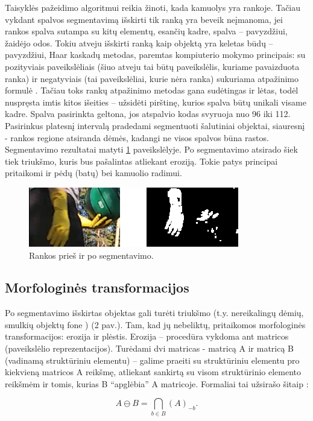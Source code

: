 \documentclass{VUMIFPSkursinis}
\begin{document}
Taisyklės pažeidimo algoritmui reikia žinoti, kada kamuolys yra rankoje. Tačiau vykdant spalvos segmentavimą išskirti tik ranką yra beveik neįmanoma, jei rankos spalva sutampa su kitų elementų, esančių kadre, spalva – pavyzdžiui, žaidėjo odos. Tokiu atveju išskirti ranką kaip objektą yra keletas būdų – pavyzdžiui, Haar kaskadų metodas, paremtas kompiuterio mokymo principais: su pozityviais paveikslėliais (šiuo atveju tai būtų paveikslėlis, kuriame pavaizduota ranka) ir negatyviais (tai paveikslėliai, kurie nėra ranka) sukuriama atpažinimo formulė \cite{HaarCascades}.  Tačiau toks rankų atpažinimo metodas gana sudėtingas ir lėtas, todėl nuspręsta imtis kitos išeities – užsidėti pirštinę, kurios spalva būtų unikali visame kadre. Spalva pasirinkta geltona, jos atspalvio kodas svyruoja nuo 96 iki 112. Pasirinkus platesnį intervalą pradedami segmentuoti šalutiniai objektai, siauresnį - rankos regione atsiranda dėmės, kadangi ne visos spalvos būna rastos. Segmentavimo rezultatai matyti \ref{imgs:rank} paveikslėlyje. Po segmentavimo atsirado šiek tiek triukšmo, kuris bus pašalintas atliekant eroziją. Tokie patys principai pritaikomi ir pėdų (batų) bei kamuolio radimui.
\begin{figure}[H]
	\centering
	\includegraphics[scale=1]{imgs/rank}
	\caption{Rankos prieš ir po segmentavimo.}
	\label{imgs:rank}
\end{figure}

\subsection{Morfologinės transformacijos}
Po segmentavimo išskirtas objektas gali turėti triukšmo (t.y. nereikalingų dėmių, smulkių objektų fone ) (2 pav.). Tam, kad jų nebeliktų, pritaikomos morfologinės transformacijos: erozija ir plėstis. Erozija – procedūra vykdoma ant matricos (paveikslėlio reprezentacijos). Turėdami dvi matricas -  matricą A ir matricą B (vadinamą struktūriniu elementu) – galime praeiti su struktūriniu elementu pro kiekvieną matricos A reikšmę, atliekant sankirtą su visom struktūrinio elemento reikšmėm ir tomis, kurias B “apglėbia” A matricoje. Formaliai tai užsirašo šitaip \cite{ImageAnalysisMorph}:

\begin{equation}\label{eq:erozija}
A \ominus B = \bigcap_ {b \in B } (A)_{-b} .
\end{equation}
\end{document}

